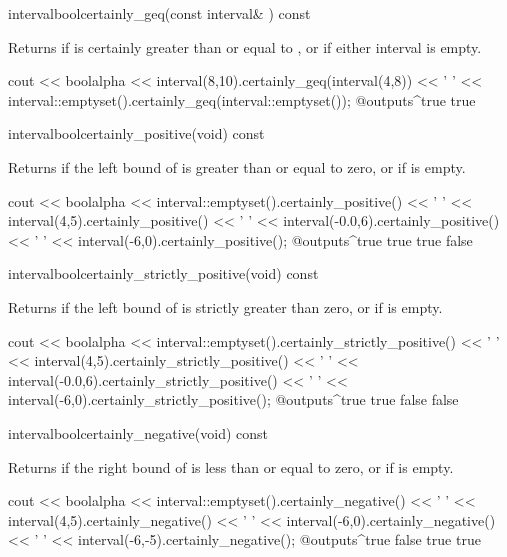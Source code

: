 \documentclass[12pt,a4paper,twoside,openright]{book}
\begin{document}
\begin{defmethod}{interval}{bool}{certainly\_geq}{(const interval\& ) const}
  \begin{operation}
  \end{operation}
  Returns  if  is certainly greater than or equal to
  , or if either interval is empty.
  \begin{example}
cout << boolalpha << interval(8,10).certainly_geq(interval(4,8)) << ' '
     << interval::emptyset().certainly_geq(interval::emptyset());
@outputs^true true~
  \end{example}
\end{defmethod}

\begin{defmethod}{interval}{bool}{certainly\_positive}{(void) const}
  \begin{operation}
  \end{operation}
  Returns  if the left bound of  is greater than or
  equal to zero, or if  is empty.
\begin{example}
cout << boolalpha << interval::emptyset().certainly_positive() << ' '
     << interval(4,5).certainly_positive() << ' '
     << interval(-0.0,6).certainly_positive() << ' '
     << interval(-6,0).certainly_positive();
@outputs^true true true false~
\end{example}
\end{defmethod}

\begin{defmethod}{interval}{bool}{certainly\_strictly\_positive}{(void) const}
  \begin{operation}
    \op{$\code{self}\subseteq\left]0,+\infty\right]$}
  \end{operation}
  Returns  if the left bound of  is strictly greater
  than zero, or if  is empty.
\begin{example}
cout << boolalpha << interval::emptyset().certainly_strictly_positive() << ' '
     << interval(4,5).certainly_strictly_positive() << ' '
     << interval(-0.0,6).certainly_strictly_positive() << ' '
     << interval(-6,0).certainly_strictly_positive();
@outputs^true true false false~
\end{example}
\end{defmethod}

\begin{defmethod}{interval}{bool}{certainly\_negative}{(void) const}
  \begin{operation}
  \end{operation}
  Returns  if the right bound of  is less than or
  equal to zero, or if  is empty.
\begin{example}
cout << boolalpha << interval::emptyset().certainly_negative() << ' '
     << interval(4,5).certainly_negative() << ' '
     << interval(-6,0).certainly_negative() << ' '
     << interval(-6,-5).certainly_negative();
@outputs^true false true true~
\end{example}
\end{defmethod}
\end{document}
